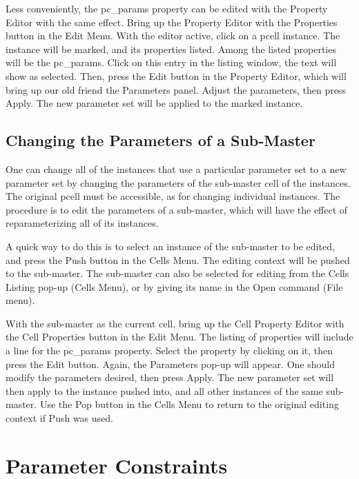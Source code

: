 Less conveniently, the {\et pc\_params} property can be edited with
the {\cb Property Editor} with the same effect.  Bring up the {\cb
Property Editor} with the {\cb Properties} button in the {\cb Edit
Menu}.  With the editor active, click on a pcell instance.  The
instance will be marked, and its properties listed.  Among the listed
properties will be the {\et pc\_params}.  Click on this entry in the
listing window, the text will show as selected.  Then, press the {\cb
Edit} button in the {\cb Property Editor}, which will bring up our old
friend the {\cb Parameters} panel.  Adjust the parameters, then press
{\cb Apply}.  The new parameter set will be applied to the marked
instance.

\subsection{Changing the Parameters of a Sub-Master}

One can change all of the instances that use a particular parameter
set to a new parameter set by changing the parameters of the
sub-master cell of the instances.  The original pcell must be
accessible, as for changing individual instances.  The procedure is to
edit the parameters of a sub-master, which will have the effect of
reparameterizing all of its instances.

A quick way to do this is to select an instance of the sub-master to
be edited, and press the {\cb Push} button in the {\cb Cells Menu}. 
The editing context will be pushed to the sub-master.  The sub-master
can also be selected for editing from the {\cb Cells Listing} pop-up
({\cb Cells Menu}), or by giving its name in the {\cb Open} command
({\cb File menu}).

With the sub-master as the current cell, bring up the {\cb Cell
Property Editor} with the {\cb Cell Properties} button in the {\cb
Edit Menu}.  The listing of properties will include a line for the
{\et pc\_params} property.  Select the property by clicking on it,
then press the {\cb Edit} button.  Again, the {\cb Parameters} pop-up
will appear.  One should modify the parameters desired, then press
{\cb Apply}.  The new parameter set will then apply to the instance
pushed into, and all other instances of the same sub-master.  Use the
{\cb Pop} button in the {\cb Cells Menu} to return to the original
editing context if {\cb Push} was used.

\section{Parameter Constraints}
\label{constraints}


